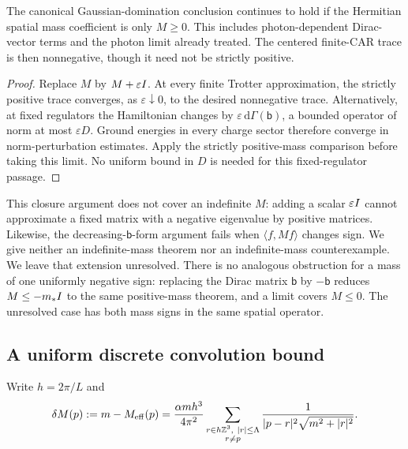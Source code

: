 \begin{proposition}
\label{prop:mass-gap-semidefinite}
The canonical Gaussian-domination conclusion continues to hold if the
Hermitian spatial mass coefficient is only $M\ge0$. This includes
photon-dependent Dirac-vector terms and the photon limit already treated.
The centered finite-CAR trace is then nonnegative, though it need not be
strictly positive.
\end{proposition}
\begin{proof}
Replace $M$ by $M+\varepsilon I$. At every finite Trotter approximation,
the strictly positive trace converges, as $\varepsilon\downarrow0$, to
the desired nonnegative trace. Alternatively, at fixed regulators the
Hamiltonian changes by $\varepsilon\,\mathrm d\Gamma(\mathsf b)$, a bounded
operator of norm at most $\varepsilon D$. Ground energies in every charge
sector therefore converge in norm-perturbation estimates. Apply the
strictly positive-mass comparison before taking this limit. No uniform
bound in $D$ is needed for this fixed-regulator passage.
\end{proof}

This closure argument does not cover an indefinite $M$: adding a scalar
$\varepsilon I$ cannot approximate a fixed matrix with a negative
eigenvalue by positive matrices. Likewise, the decreasing-$\mathsf b$-form
argument fails when $\langle f,Mf\rangle$ changes sign. We give neither
an indefinite-mass theorem nor an indefinite-mass counterexample.
We leave that extension unresolved.
There is no analogous obstruction for a mass of one uniformly negative
sign: replacing the Dirac matrix $\mathsf b$ by $-\mathsf b$ reduces
$M\le-m_*I$ to the same positive-mass theorem, and a limit covers
$M\le0$. The unresolved case has both mass signs in the same spatial
operator.

\subsection{A uniform discrete convolution bound}
\label{subsec:mass-gap-discrete}

Write $h=2\pi/L$ and
\begin{equation}
 \delta M(p):=m-M_{\mathrm{eff}}(p)
 =\frac{\alpha m h^3}{4\pi^2}
 \sum_{\substack{r\in h\mathbb Z^3,\ |r|\le\Lambda\\r\ne p}}
 \frac{1}{|p-r|^2\sqrt{m^2+|r|^2}}.
 \label{eq:mass-gap-deficit}
\end{equation}

